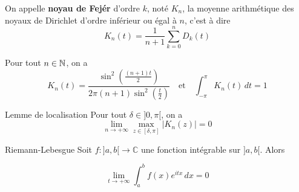 \documentclass[a4paper,12pt]{article}
\begin{document}
\begin{definition}
    On appelle \textbf{noyau de Fejér} d'ordre $k$, noté $K_n$, la moyenne arithmétique des noyaux de Dirichlet d'ordre inférieur ou égal à $n$, c'est à dire
    $$
    K_n(t) = \frac{1}{n + 1} \sum_{k=0}^n D_k(t)
    $$
\end{definition}

\begin{proposition}{}{}
    Pour tout $n \in \mathbb{N}$, on a
    $$
    K_n(t) = \frac{\sin^2(\frac{(n + 1)t}{2})}{2\pi (n + 1) \sin^2(\frac{t}{2})} \quad \text{et} \quad \int_{-\pi}^{\pi} K_n(t) \, dt = 1
    $$
\end{proposition}

\begin{lemme}{Lemme de localisation}{}
    Pour tout $\delta \in ]0, \pi[$, on a
    $$
    \lim_{n \to +\infty} \max_{z \in [\delta, \pi]} |K_n(z)| = 0
    $$
\end{lemme}

\clearpage

\begin{lemme}{Riemann-Lebesgue}{}
    Soit $f : ]a, b[ \to \mathbb{C}$ une fonction intégrable sur $]a, b[$. Alors

    $$
    \lim_{t \to +\infty} \int_a^b f(x) e^{i t x} \, dx = 0
    $$
\end{lemme}
\end{document}
